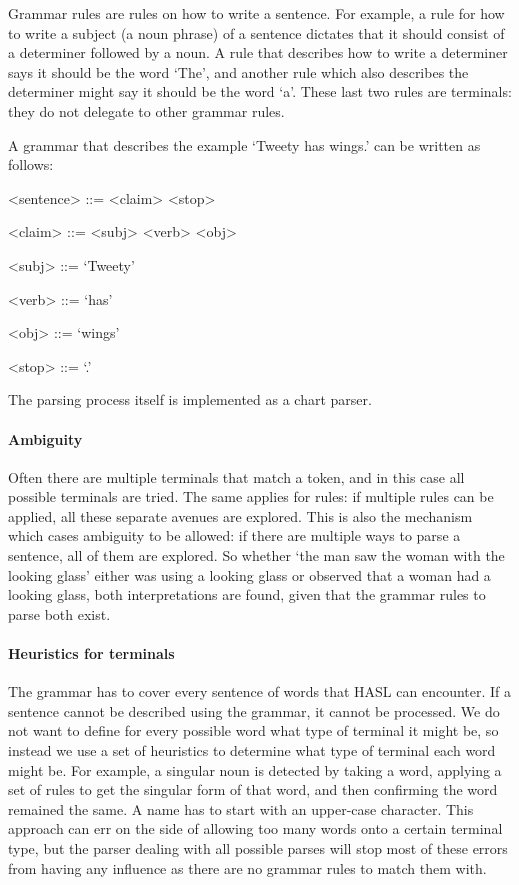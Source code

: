\documentclass{IOS-Book-Article}
\begin{document}
Grammar rules are rules on how to write a sentence. For example, a rule for how to write a subject (a noun phrase) of a sentence dictates that it should consist of a determiner followed by a noun. A rule that describes how to write a determiner says it should be the word `The', and another rule which also describes the determiner might say it should be the word `a'. These last two rules are terminals: they do not delegate to other grammar rules.

A grammar that describes the example `Tweety has wings.' can be written as follows:

\begin{grammar}
<sentence> ::= <claim> <stop>

<claim> ::= <subj> <verb> <obj>

<subj> ::= `Tweety'

<verb> ::= `has'

<obj> ::= `wings'

<stop> ::= `.'
\end{grammar}

The parsing process itself is implemented as a chart parser.

\paragraph{Ambiguity} Often there are multiple terminals that match a token, and in this case all possible terminals are tried. The same applies for rules: if multiple rules can be applied, all these separate avenues are explored. This is also the mechanism which cases ambiguity to be allowed: if there are multiple ways to parse a sentence, all of them are explored. So whether `the man saw the woman with the looking glass' either was using a looking glass or observed that a woman had a looking glass, both interpretations are found, given that the grammar rules to parse both exist.

\paragraph{Heuristics for terminals} The grammar has to cover every sentence of words that HASL can encounter. If a sentence cannot be described using the grammar, it cannot be processed. We do not want to define for every possible word what type of terminal it might be, so instead we use a set of heuristics to determine what type of terminal each word might be. For example, a singular noun is detected by taking a word, applying a set of rules \cite{deSmedtDaelemans2012} to get the singular form of that word, and then confirming the word remained the same. A name has to start with an upper-case character. This approach can err on the side of allowing too many words onto a certain terminal type, but the parser dealing with all possible parses will stop most of these errors from having any influence as there are no grammar rules to match them with.
\end{document}
